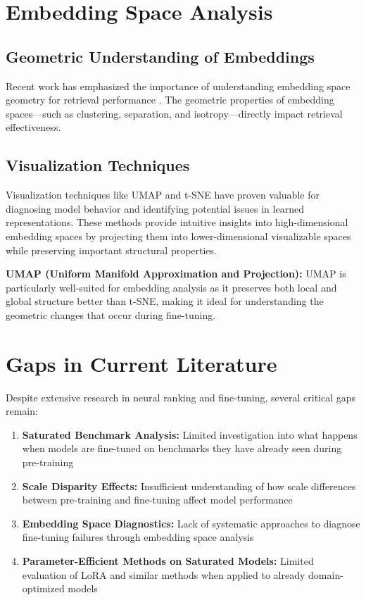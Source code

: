 \section{Embedding Space Analysis}

\subsection{Geometric Understanding of Embeddings}

Recent work has emphasized the importance of understanding embedding space geometry for retrieval performance \cite{reimers2019sentence}. The geometric properties of embedding spaces—such as clustering, separation, and isotropy—directly impact retrieval effectiveness.

\subsection{Visualization Techniques}

Visualization techniques like UMAP \cite{mcinnes2018umap} and t-SNE \cite{maaten2008visualizing} have proven valuable for diagnosing model behavior and identifying potential issues in learned representations. These methods provide intuitive insights into high-dimensional embedding spaces by projecting them into lower-dimensional visualizable spaces while preserving important structural properties.

\textbf{UMAP (Uniform Manifold Approximation and Projection):} UMAP is particularly well-suited for embedding analysis as it preserves both local and global structure better than t-SNE, making it ideal for understanding the geometric changes that occur during fine-tuning.

\section{Gaps in Current Literature}

Despite extensive research in neural ranking and fine-tuning, several critical gaps remain:

\begin{enumerate}
\item \textbf{Saturated Benchmark Analysis:} Limited investigation into what happens when models are fine-tuned on benchmarks they have already seen during pre-training
\item \textbf{Scale Disparity Effects:} Insufficient understanding of how scale differences between pre-training and fine-tuning affect model performance
\item \textbf{Embedding Space Diagnostics:} Lack of systematic approaches to diagnose fine-tuning failures through embedding space analysis
\item \textbf{Parameter-Efficient Methods on Saturated Models:} Limited evaluation of LoRA and similar methods when applied to already domain-optimized models
\end{enumerate}

